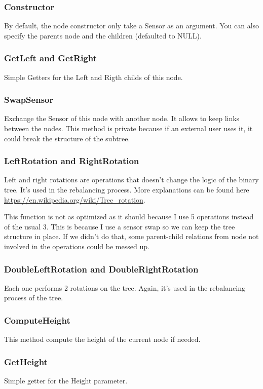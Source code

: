 \documentclass[10pt]{article}
\begin{document}
\subsubsection*{Constructor}
By default, the node constructor only take a Sensor as an argument. You can also specify the parents node and the children (defaulted to NULL).
\subsubsection*{GetLeft and GetRight}
Simple Getters for the Left and Rigth childs of this node.
\subsubsection*{SwapSensor}
Exchange the Sensor of this node with another node. It allows to keep links between the nodes. This method is private because if an external user uses it, it could break the structure of the subtree.

\subsubsection*{LeftRotation and RightRotation}
Left and right rotations are operations that doesn't change the logic of the binary tree. It's used in the rebalancing process. More explanations can be found here \url{https://en.wikipedia.org/wiki/Tree_rotation}.

This function is not as optimized as it should because I use 5 operations instead of the usual 3. This is because I use a sensor swap so we can keep the tree structure in place. If we didn't do that, some parent-child relations from node not involved in the operations could be messed up.

\subsubsection*{DoubleLeftRotation and DoubleRightRotation}
Each one performs 2 rotations on the tree. Again, it's used in the rebalancing process of the tree.

\subsubsection*{ComputeHeight}
This method compute the height of the current node if needed.

\subsubsection*{GetHeight}
Simple getter for the Height parameter.
\end{document}
